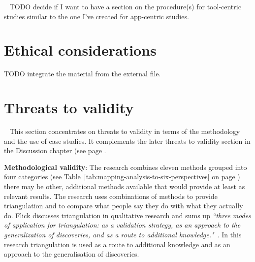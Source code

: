 \hrulefill

~\label{methodology-tool-centric-case-studies}
TODO decide if I want to have a section on the procedure(s) for tool-centric studies similar to the one I've created for app-centric studies.

\section{Ethical considerations}

TODO integrate the material from the external file.


\section{Threats to validity}~\label{methodology-threats-to-validity-section}
This section concentrates on threats to validity in terms of the methodology and the use of case studies. It complements the later threats to validity section in the Discussion chapter (see page \pageref{discussion-threats-to-validity-section}.

\textbf{Methodological validity}: The research combines eleven methods grouped into four categories (see Table~\ref{tab:mapping-analysis-to-six-perspectives} on page \pageref{tab:mapping-analysis-to-six-perspectives}) there may be other, additional methods available that would provide at least as relevant results. The research uses combinations of methods to provide triangulation and to compare what people say they do with what they actually do. Flick discusses triangulation in qualitative research and sums up \emph{``three modes of application for triangulation: as a validation strategy, as an approach to the generalization of discoveries, and as a route to additional knowledge."}~\citep[p.183]{flick2004_triangulation_in_qualitative_research}. In this research triangulation is used as a route to additional knowledge and as an approach to the generalisation of discoveries.

